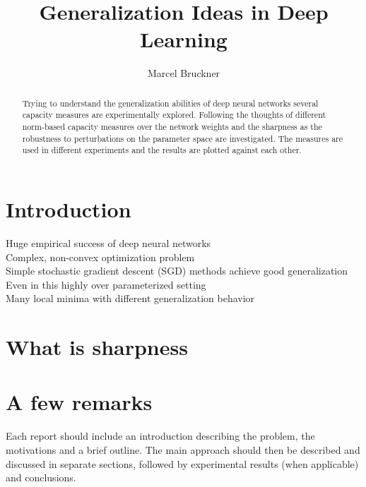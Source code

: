 \documentclass[a4paper,10pt]{article}
\title{Generalization Ideas in Deep Learning} %
\author{Marcel Bruckner} %
\institute{\textit{Seminar: Optimization and Generalization in Deep Learning}}
\begin{document}
\maketitle

\begin{abstract}
Trying to understand the generalization abilities of deep neural networks several capacity measures are experimentally explored. Following the thoughts of \cite{neyshabur2017exploring} different norm-based capacity measures over the network weights and the sharpness as the robustness to perturbations on the parameter space are investigated. The measures are used in different experiments and the results are plotted against each other.
\end{abstract}

\section{Introduction}
Huge empirical success of deep neural networks \\
Complex, non-convex optimization problem \\
Simple stochastic gradient descent (SGD) methods achieve good generalization \\
Even in this highly over parameterized setting \\
Many local minima with different generalization behavior 
%


\section{What is sharpness}

\newpage


\newpage

\section{A few remarks}
Each report should include an introduction describing the problem, the motivations and a brief outline. The main approach should then be described and discussed in separate sections, followed by experimental results (when applicable) and conclusions.
\end{document}
